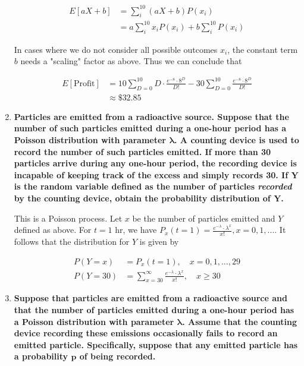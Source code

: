 \documentclass[10pt, oneside]{article}   	%
\theoremstyle{definition}
\begin{document}
\begin{enumerate}[label=8.\arabic*]
\begin{align*}
E[aX+b] &= \sum^{10}_i (aX + b) P(x_i) \\
&= a \sum^{10}_i x_i P(x_i) + b \sum^{10}_i P(x_i)
\end{align*}

In cases where we do not consider all possible outcomes $x_i$, the constant term $b$ needs a "scaling" factor as above. Thus we can conclude that

\begin{align*}
E[\text{Profit}] &= 10 \sum^{10}_{D = 0} D \cdot \frac{e^{-8} \cdot 8^D}{D!} - 30 \sum^{10}_{D = 0} \frac{e^{-8} \cdot 8^D}{D!} \\
&\approx \boxed{\$32.85}
\end{align*}

\newpage
\item  \begin{tcolorbox}[
  colback=Cerulean!5!white,
  colframe=Cerulean!75!black]
\textbf{Particles are emitted from a radioactive source. Suppose that the number of such particles emitted during a one-hour period has a Poisson distribution with parameter $\bm{\lambda}$. A counting device is used to record the number of such particles emitted. If more than 30 particles arrive during any one-hour period, the recording device is incapable of keeping track of the excess and simply records 30. If $\bm{Y}$ is the random variable defined as the number of particles \textit{recorded} by the counting device, obtain the probability distribution of $\bm{Y}$.}
\end{tcolorbox}

This is a Poisson process. Let $x$ be the number of particles emitted and $Y$ defined as above. For $t = 1$ hr, we have $P_x (t = 1) = \frac{e^{-\lambda} \cdot \lambda^x}{x!}, x = 0, 1, ...$. It follows that the distribution for $Y$ is given by

\begin{align*}
P(Y = x) &= P_x (t=1), \quad x = 0, 1, ..., 29 \\
P(Y = 30) &= \sum^{\infty}_{x = 30} \frac{e^{-\lambda} \cdot \lambda^x}{x!}, \quad x \geq 30
\end{align*}

\item  \begin{tcolorbox}[
  colback=Cerulean!5!white,
  colframe=Cerulean!75!black]
\textbf{Suppose that particles are emitted from a radioactive source and that the number of particles emitted during a one-hour period has a Poisson distribution with parameter $\bm{\lambda}$. Assume that the counting device recording these emissions occasionally fails to record an emitted particle. Specifically, suppose that any emitted particle has a probability $\bm{p}$ of being recorded.}
\end{tcolorbox}


\end{enumerate}
\end{document}
